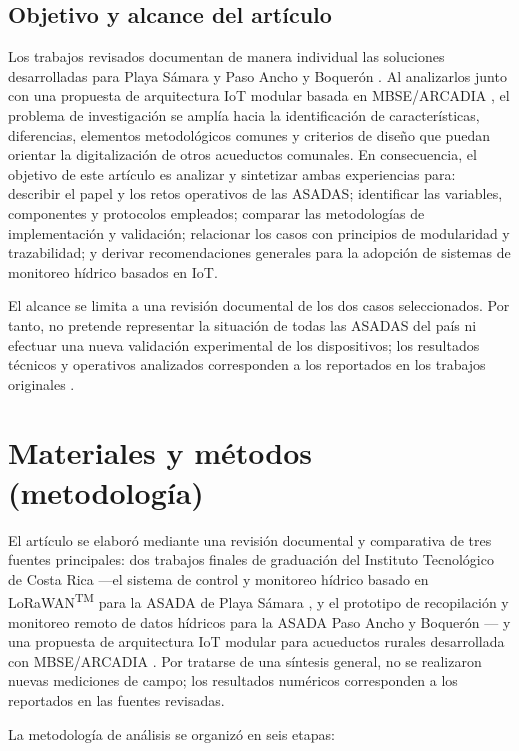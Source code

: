 \documentclass[12pt,letterpaper]{article}
\begin{document}
\subsection{Objetivo y alcance del artículo}
Los trabajos revisados documentan de manera individual las soluciones desarrolladas para Playa Sámara y Paso Ancho y Boquerón \cite{solorzano2021,oviedo2024}. Al analizarlos junto con una propuesta de arquitectura IoT modular basada en MBSE/ARCADIA \cite{arguedas2025}, el problema de investigación se amplía hacia la identificación de características, diferencias, elementos metodológicos comunes y criterios de diseño que puedan orientar la digitalización de otros acueductos comunales. En consecuencia, el objetivo de este artículo es analizar y sintetizar ambas experiencias para: describir el papel y los retos operativos de las ASADAS; identificar las variables, componentes y protocolos empleados; comparar las metodologías de implementación y validación; relacionar los casos con principios de modularidad y trazabilidad; y derivar recomendaciones generales para la adopción de sistemas de monitoreo hídrico basados en IoT.

El alcance se limita a una revisión documental de los dos casos seleccionados. Por tanto, no pretende representar la situación de todas las ASADAS del país ni efectuar una nueva validación experimental de los dispositivos; los resultados técnicos y operativos analizados corresponden a los reportados en los trabajos originales \cite{solorzano2021,oviedo2024}.

\section{Materiales y métodos (metodología)}
El artículo se elaboró mediante una revisión documental y comparativa de tres fuentes principales: dos trabajos finales de graduación del Instituto Tecnológico de Costa Rica ---el sistema de control y monitoreo hídrico basado en LoRaWAN\textsuperscript{TM} para la ASADA de Playa Sámara \cite{solorzano2021}, y el prototipo de recopilación y monitoreo remoto de datos hídricos para la ASADA Paso Ancho y Boquerón \cite{oviedo2024}--- y una propuesta de arquitectura IoT modular para acueductos rurales desarrollada con MBSE/ARCADIA \cite{arguedas2025}. Por tratarse de una síntesis general, no se realizaron nuevas mediciones de campo; los resultados numéricos corresponden a los reportados en las fuentes revisadas.

La metodología de análisis se organizó en seis etapas:
\end{document}

